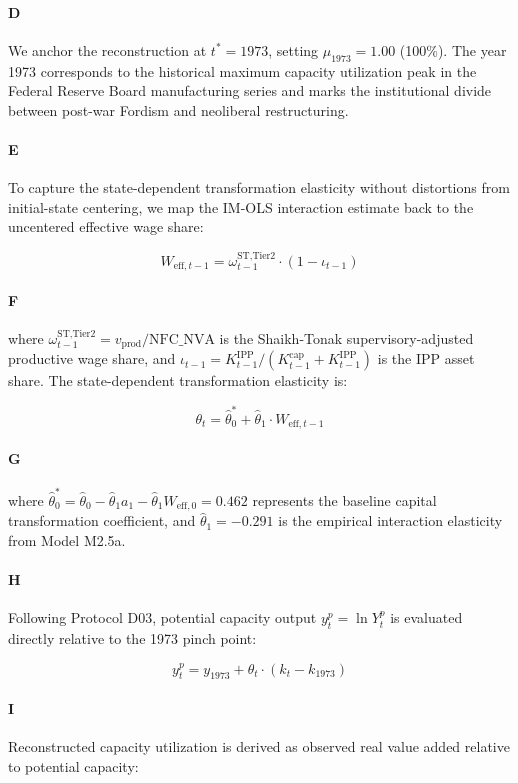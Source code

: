 \paragraph{D}
We anchor the reconstruction at $t^* = 1973$, setting $\mu_{1973} = 1.00$ (100\%). The year 1973 corresponds to the historical maximum capacity utilization peak in the Federal Reserve Board manufacturing series and marks the institutional divide between post-war Fordism and neoliberal restructuring.

\paragraph{E}
To capture the state-dependent transformation elasticity without distortions from initial-state centering, we map the IM-OLS interaction estimate back to the uncentered effective wage share:

\[W_{\text{eff}, t-1} = \omega_{t-1}^{\text{ST,Tier2}} \cdot (1 - \iota_{t-1})\]

\paragraph{F}
where $\omega_{t-1}^{\text{ST,Tier2}} = v_{\text{prod}} / \text{NFC\_NVA}$ is the Shaikh-Tonak supervisory-adjusted productive wage share, and $\iota_{t-1} = K_{t-1}^{\text{IPP}} / (K_{t-1}^{\text{cap}} + K_{t-1}^{\text{IPP}})$ is the IPP asset share. The state-dependent transformation elasticity is:

\[\theta_t = \hat{\theta}_0^* + \hat{\theta}_1 \cdot W_{\text{eff}, t-1}\]

\paragraph{G}
where $\hat{\theta}_0^* = \hat{\theta}_0 - \hat{\theta}_1 a_1 - \hat{\theta}_1 W_{\text{eff}, 0} = 0.462$ represents the baseline capital transformation coefficient, and $\hat{\theta}_1 = -0.291$ is the empirical interaction elasticity from Model M2.5a.

\paragraph{H}
Following Protocol D03, potential capacity output $y_t^p = \ln Y_t^p$ is evaluated directly relative to the 1973 pinch point:

\[y_t^p = y_{1973} + \theta_t \cdot (k_t - k_{1973})\]

\paragraph{I}
Reconstructed capacity utilization is derived as observed real value added relative to potential capacity:

